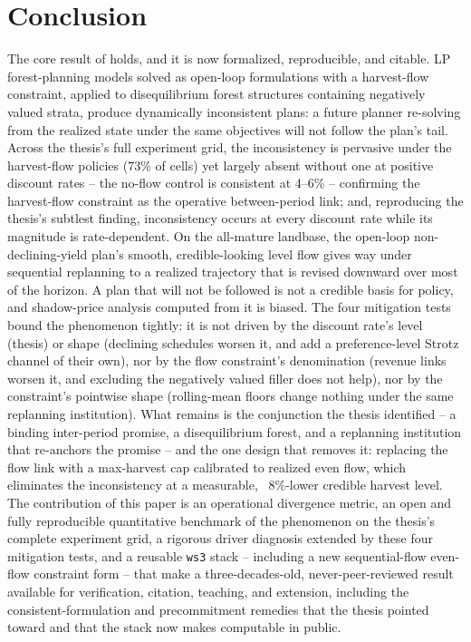 \section{Conclusion}

The core result of \citet{daugherty1991credibility} holds, and it is now formalized, reproducible, and citable. LP forest-planning models solved as open-loop formulations with a harvest-flow constraint, applied to disequilibrium forest structures containing negatively valued strata, produce dynamically inconsistent plans: a future planner re-solving from the realized state under the same objectives will not follow the plan's tail. Across the thesis's full experiment grid, the inconsistency is pervasive under the harvest-flow policies (73\% of cells) yet largely absent without one at positive discount rates -- the no-flow control is consistent at 4--6\% -- confirming the harvest-flow constraint as the operative between-period link; and, reproducing the thesis's subtlest finding, inconsistency occurs at every discount rate while its magnitude is rate-dependent. On the all-mature landbase, the open-loop non-declining-yield plan's smooth, credible-looking level flow gives way under sequential replanning to a realized trajectory that is revised downward over most of the horizon. A plan that will not be followed is not a credible basis for policy, and shadow-price analysis computed from it is biased. The four mitigation tests bound the phenomenon tightly: it is not driven by the discount rate's level (thesis) or shape (declining schedules worsen it, and add a preference-level Strotz channel of their own), nor by the flow constraint's denomination (revenue links worsen it, and excluding the negatively valued filler does not help), nor by the constraint's pointwise shape (rolling-mean floors change nothing under the same replanning institution). What remains is the conjunction the thesis identified -- a binding inter-period promise, a disequilibrium forest, and a replanning institution that re-anchors the promise -- and the one design that removes it: replacing the flow link with a max-harvest cap calibrated to realized even flow, which eliminates the inconsistency at a measurable, ~8\%-lower credible harvest level. The contribution of this paper is an operational divergence metric, an open and fully reproducible quantitative benchmark of the phenomenon on the thesis's complete experiment grid, a rigorous driver diagnosis extended by these four mitigation tests, and a reusable \texttt{ws3} stack -- including a new sequential-flow even-flow constraint form -- that make a three-decades-old, never-peer-reviewed result available for verification, citation, teaching, and extension, including the consistent-formulation and precommitment remedies that the thesis pointed toward and that the stack now makes computable in public.
